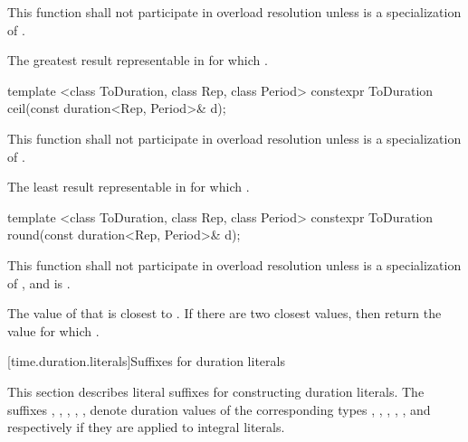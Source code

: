 \begin{itemdescr}
\pnum
\remarks This function shall not participate in overload resolution
unless  is a specialization of .

\pnum
\returns The greatest result  representable in 
for which .
\end{itemdescr}

%
\begin{itemdecl}
template <class ToDuration, class Rep, class Period>
  constexpr ToDuration ceil(const duration<Rep, Period>& d);
\end{itemdecl}

\begin{itemdescr}
\pnum
\remarks This function shall not participate in overload resolution
unless  is a specialization of .

\pnum
\returns The least result  representable in 
for which .
\end{itemdescr}

%
\begin{itemdecl}
template <class ToDuration, class Rep, class Period>
  constexpr ToDuration round(const duration<Rep, Period>& d);
\end{itemdecl}

\begin{itemdescr}
\pnum
\remarks This function shall not participate in overload resolution
unless  is a specialization of ,
and 
is .

\pnum
\returns The value of  that is closest to .
If there are two closest values, then return the value 
for which .
\end{itemdescr}

[time.duration.literals]{Suffixes for duration literals}

\pnum
This section describes literal suffixes for constructing duration literals. The
suffixes , , , , , 
denote duration values of the corresponding types , ,
, , , and 
respectively if they are applied to integral literals.

